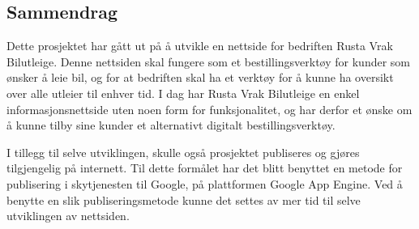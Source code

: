 \documentclass[11pt, oneside]{Thesis} %
\begin{document}
\begin{adjustwidth*}{2cm}{2cm}
\let\clearpage\relax
\chapter{Sammendrag}
Dette prosjektet har gått ut på å utvikle en nettside for bedriften Rusta Vrak Bilutleige. Denne nettsiden skal fungere som et bestillingsverktøy for kunder som ønsker å leie bil, og for at bedriften skal ha et verktøy for å kunne ha oversikt over alle utleier til enhver tid. I dag har Rusta Vrak Bilutleige en enkel informasjonsnettside uten noen form for funksjonalitet, og har derfor et ønske om å kunne tilby sine kunder et alternativt digitalt bestillingsverktøy.
 
 
I tillegg til selve utviklingen, skulle også prosjektet publiseres og gjøres tilgjengelig på internett. Til dette formålet har det blitt benyttet en metode for publisering i skytjenesten til Google, på plattformen Google App Engine. Ved å benytte en slik publiseringsmetode kunne det settes av mer tid til selve utviklingen av nettsiden.



\end{adjustwidth*}




\newpage

\pagestyle{fancy} %

\tableofcontents %

\listoffigures %


\end{document}
